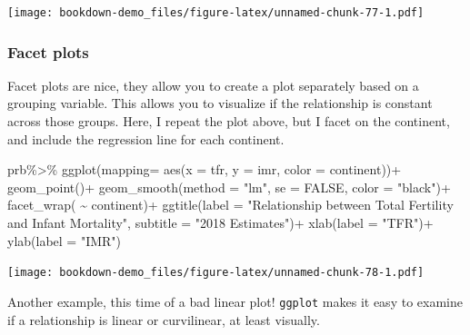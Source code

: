 \documentclass[
]{article}
\newenvironment{Shaded}{\begin{snugshade}}{\end{snugshade}}
\newcommand{\AttributeTok}[1]{\textcolor[rgb]{0.77,0.63,0.00}{#1}}
\newcommand{\ConstantTok}[1]{\textcolor[rgb]{0.00,0.00,0.00}{#1}}
\newcommand{\FunctionTok}[1]{\textcolor[rgb]{0.00,0.00,0.00}{#1}}
\newcommand{\NormalTok}[1]{#1}
\newcommand{\SpecialCharTok}[1]{\textcolor[rgb]{0.00,0.00,0.00}{#1}}
\newcommand{\StringTok}[1]{\textcolor[rgb]{0.31,0.60,0.02}{#1}}
\begin{document}
\texttt{[image: bookdown-demo\_files/figure-latex/unnamed-chunk-77-1.pdf]}

\hypertarget{facet-plots}{%
\subsubsection{Facet plots}\label{facet-plots}}

Facet plots are nice, they allow you to create a plot separately based
on a grouping variable. This allows you to visualize if the relationship
is constant across those groups. Here, I repeat the plot above, but I
facet on the continent, and include the regression line for each
continent.

\begin{Shaded}
\begin{Highlighting}[]
\NormalTok{prb}\SpecialCharTok{\%\textgreater{}\%}
\FunctionTok{ggplot}\NormalTok{(}\AttributeTok{mapping=} \FunctionTok{aes}\NormalTok{(}\AttributeTok{x =}\NormalTok{ tfr,}
                    \AttributeTok{y =}\NormalTok{ imr,}
                    \AttributeTok{color =}\NormalTok{ continent))}\SpecialCharTok{+}
  \FunctionTok{geom\_point}\NormalTok{()}\SpecialCharTok{+}
  \FunctionTok{geom\_smooth}\NormalTok{(}\AttributeTok{method =} \StringTok{"lm"}\NormalTok{,}
              \AttributeTok{se =} \ConstantTok{FALSE}\NormalTok{,}
              \AttributeTok{color =} \StringTok{"black"}\NormalTok{)}\SpecialCharTok{+}
  \FunctionTok{facet\_wrap}\NormalTok{( }\SpecialCharTok{\textasciitilde{}}\NormalTok{ continent)}\SpecialCharTok{+}
  \FunctionTok{ggtitle}\NormalTok{(}\AttributeTok{label =} \StringTok{"Relationship between Total Fertility and Infant Mortality"}\NormalTok{,}
          \AttributeTok{subtitle =} \StringTok{"2018 Estimates"}\NormalTok{)}\SpecialCharTok{+}
  \FunctionTok{xlab}\NormalTok{(}\AttributeTok{label =} \StringTok{"TFR"}\NormalTok{)}\SpecialCharTok{+}
  \FunctionTok{ylab}\NormalTok{(}\AttributeTok{label =} \StringTok{"IMR"}\NormalTok{)}
\end{Highlighting}
\end{Shaded}

\texttt{[image: bookdown-demo\_files/figure-latex/unnamed-chunk-78-1.pdf]}

Another example, this time of a bad linear plot! \texttt{ggplot} makes it easy
to examine if a relationship is linear or curvilinear, at least
visually.
\end{document}
